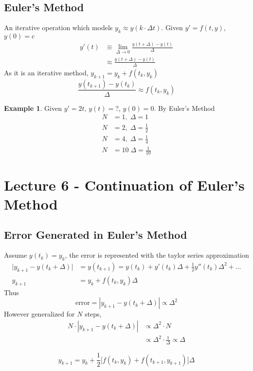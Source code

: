 \documentclass{report}
\theoremstyle{definition}
\newtheorem{example}{Example}
\theoremstyle{plain}
\theoremstyle{remark}
\begin{document}
\subsection{Euler's Method}
An iterative operation which models $ y_k \approx y(k\cdot \Delta t)$. Given
$ y' = f(t,y) $, $ y(0) = c$ 
\begin{align}
  y'(t) &\equiv \lim_{\Delta \to 0} \frac{y(t+\Delta) - y(t)}{\Delta}\\ &\approx \frac{y(t+\Delta) - y(t)}{\Delta}
\end{align}
As it is an iterative method, $ y_{k+1} = y_{k} + f(t_k, y_k) $
$$ \frac{y(t_{k+1})-y(t_k)}{\Delta} \approx f(t_k, y_k) $$
\begin{example}
  Given $ y' = 2t $, $ y(t) = ? $, $ y(0) = 0 $. By Euler's Method
  \begin{align}
    N &= 1, \; \Delta = 1 \\
    N &= 2, \; \Delta = \frac{1}{2}\\
    N &= 4, \; \Delta = \frac{1}{4}\\
    N &= 10 \; \Delta = \frac{1}{10}
  \end{align}
\end{example}

\section{Lecture 6 - Continuation of Euler's Method}
\subsection{Error Generated in Euler's Method}
Assume $ y(t_k) = y_k $, the error is represented with the taylor series
approximation 
\begin{align*}
  \Big | y_{k+1} - y(t_k + \Delta) \Big | &= y(t_{k+1}) = y(t_k)
+ y'(t_k)\Delta + \frac{1}{2}y''(t_k) \Delta^2 + ... \\
  y_{k+1} &= y_k + f(t_k, y_k)\Delta
\end{align*}
Thus $$ \text{error} = |y_{k+1} - y(t_k + \Delta)| \propto \Delta^2 $$
However generalized for $ N $ steps,
\begin{align*}
  N\cdot|y_{k+1} - y(t_k + \Delta)| &\propto \Delta^2 \cdot N \\
				    &\propto \Delta^2 \cdot \frac{1}{\Delta}
				    \propto \Delta
\end{align*}

$$ y_{k+1} = y_k + \frac{1}{2}\Big[f(t_k, y_k) + f(t_{k+1}, y_{k+1}) \Big]
\Delta$$
\end{document}
